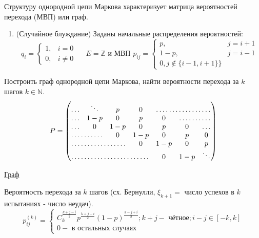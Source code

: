 Структуру однородной цепи Маркова характеризует матрица вероятностей перехода (МВП) или граф.
\begin{enumerate}
	\item (Случайное блуждание) Заданы начальные распределения вероятностей:
	\[
	q_i =
	\begin{cases}
		1, &i = 0 \\
		0, &i \ne 0
	\end{cases}
	~~~~~~
	E = \mathbb{Z} \text{ и МВП }
	p_{ij} =
	\begin{cases}
		p, &j = i + 1 \\
		1 - p, &j = i - 1 \\
		0, j \notin \{i-1,i+1\}\}
	\end{cases}
	\]
\end{enumerate}

\begin{exmp}\label{cm-ex_1}
	Построить граф однородной цепи Маркова, найти вероятности перехода за $k$ шагов $k \in \mathbb{N}$.
	\[
	P = 
	\begin{pmatrix}
		\ldots       & \ddots & p   & 0 & \hdotsfor{3} \\
		\ldots       & 1-p    & 0   & p & 0 & \hdotsfor{2} \\
		\ldots       & 0      & 1-p & 0 & p & 0 & \ldots \\
		\hdotsfor{2} & 0      & 1-p & 0 & p & 0 \\
		\hdotsfor{3} & 0      & 1-p & 0 & p \\
		\hdotsfor{4} & 0      & 1-p & \ddots
	\end{pmatrix}
	\]
\end{exmp}
\begin{center}
	\underline{Граф}
\end{center}
\begin{figure}[h]
\end{figure}
Вероятность перехода за $k$ шагов (сх. Бернулли, $\xi_{k+1} =$ число успехов в $k$ испытаниях - число неудач).
\[
p_{ij}^{(k)} =
\begin{cases}
	C_k^{\frac{k+j-i}{2}}p^{\frac{k+j-i}{2}} (1-p)^{\frac{k-j+i}{2}}; k+j - \text{ чётное}; i-j \in [-k, k] \\
	0 - \text{ в остальных случаях}
\end{cases}
\]

